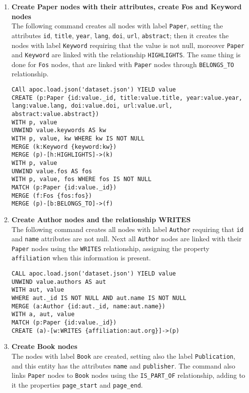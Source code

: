\begin{enumerate}
    \item \textbf{Create Paper nodes with their attributes, create Fos and Keyword nodes}\\
    The following command creates all nodes with label \verb|Paper|, setting the attributes \verb|id|, \verb|title|, \verb|year|, \verb|lang|, \verb|doi|, \verb|url|, \verb|abstract|;
    then it creates the nodes with label \verb|Keyword| requiring that the value is not null, moreover \verb|Paper| and \verb|Keyword| are linked with the relationship \verb|HIGHLIGHTS|.
    The same thing is done for \verb|Fos| nodes, that are linked with \verb|Paper| nodes through \verb|BELONGS_TO| relationship.
    \begin{lstlisting}[label={lst:lstlisting2}]
CAll apoc.load.json('dataset.json') YIELD value
CREATE (p:Paper {id:value._id, title:value.title, year:value.year, lang:value.lang, doi:value.doi, url:value.url, abstract:value.abstract})
WITH p, value
UNWIND value.keywords AS kw
WITH p, value, kw WHERE kw IS NOT NULL
MERGE (k:Keyword {keyword:kw})
MERGE (p)-[h:HIGHLIGHTS]->(k)
WITH p, value
UNWIND value.fos AS fos
WITH p, value, fos WHERE fos IS NOT NULL
MATCH (p:Paper {id:value._id})
MERGE (f:Fos {fos:fos})
MERGE (p)-[b:BELONGS_TO]->(f)
    \end{lstlisting}
    \item \textbf{Create Author nodes and the relationship WRITES}\\
    The following command creates all nodes with label \verb|Author| requiring that \verb|id| and \verb|name| attributes are not null.
    Next all \verb|Author| nodes are linked with their \verb|Paper| nodes using the \verb|WRITES| relationship, assigning the property \verb|affiliation| when this information is present.
    \begin{lstlisting}[label={lst:lstlisting3}]
CALL apoc.load.json('dataset.json') YIELD value
UNWIND value.authors AS aut
WITH aut, value
WHERE aut._id IS NOT NULL AND aut.name IS NOT NULL
MERGE (a:Author {id:aut._id, name:aut.name})
WITH a, aut, value
MATCH (p:Paper {id:value._id})
CREATE (a)-[w:WRITES {affiliation:aut.org}]->(p)
    \end{lstlisting}
    \item \textbf{Create Book nodes}\\
    The nodes with label \verb|Book| are created, setting also the label \verb|Publication|, and this entity has the attributes \verb|name| and \verb|publisher|.
    The command also links \verb|Paper| nodes to \verb|Book| nodes using the \verb|IS_PART_OF| relationship, adding to it the properties \verb|page_start| and \verb|page_end|.

\end{enumerate}
